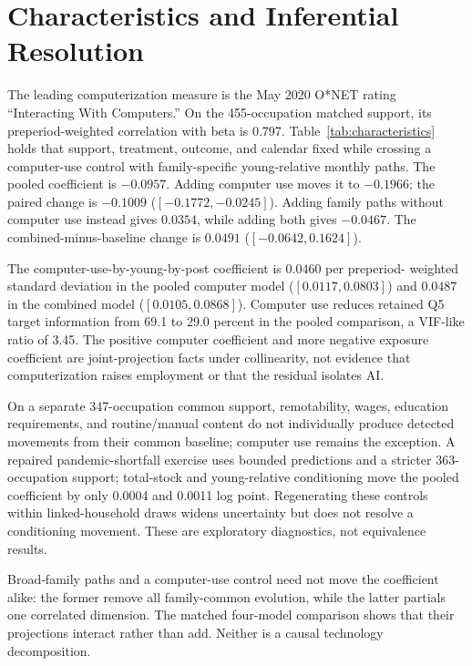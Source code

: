 \section{Characteristics and Inferential Resolution}\label{sec:characteristics}

The leading computerization measure is the May 2020 O*NET rating
``Interacting With Computers.''  On the 455-occupation matched support, its
preperiod-weighted correlation with beta is 0.797.  Table~\ref{tab:characteristics}
holds that support, treatment, outcome, and calendar fixed while crossing a
computer-use control with family-specific young-relative monthly paths.  The
pooled coefficient is $-0.0957$.  Adding computer use moves it to $-0.1966$;
the paired change is $-0.1009$ ($[-0.1772,-0.0245]$).  Adding family paths
without computer use instead gives $0.0354$, while adding both gives $-0.0467$.
The combined-minus-baseline change is $0.0491$ ($[-0.0642,0.1624]$).

The computer-use-by-young-by-post coefficient is $0.0460$ per preperiod-
weighted standard deviation in the pooled computer model
($[0.0117,0.0803]$) and $0.0487$ in the combined model
($[0.0105,0.0868]$).  Computer use reduces retained Q5 target information
from 69.1 to 29.0 percent in the pooled comparison, a VIF-like ratio of 3.45.
The positive computer coefficient and more negative exposure coefficient are
joint-projection facts under collinearity, not evidence that computerization
raises employment or that the residual isolates AI.

On a separate 347-occupation common support, remotability, wages, education
requirements, and routine/manual content do not individually produce detected
movements from their common baseline; computer use remains the exception.
A repaired pandemic-shortfall exercise uses bounded predictions and a stricter
363-occupation support; total-stock and young-relative conditioning move the
pooled coefficient by only 0.0004 and 0.0011 log point.  Regenerating these
controls within linked-household draws widens uncertainty but does not resolve
a conditioning movement.  These are exploratory diagnostics, not equivalence
results.



Broad-family paths and a computer-use control need not move the coefficient
alike: the former remove all family-common evolution, while the latter partials
one correlated dimension.  The matched four-model comparison shows that their
projections interact rather than add.  Neither is a causal technology
decomposition.

